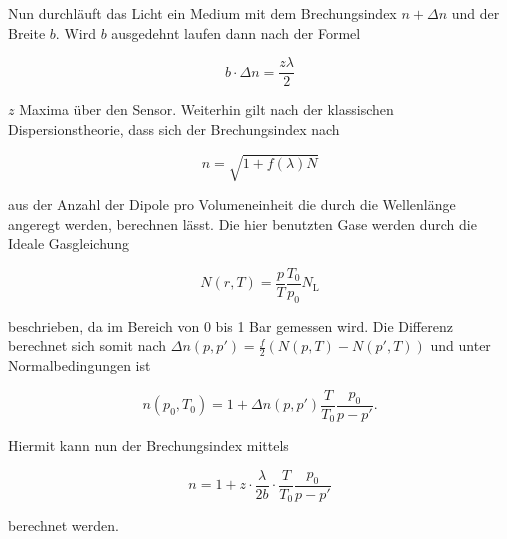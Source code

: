         \noindent Nun durchläuft das Licht ein Medium mit dem Brechungsindex $n+\Delta n $ und der Breite $b$. Wird $b$ ausgedehnt laufen 
        dann nach der Formel

        \begin{equation}
            b \cdot \Delta n = \frac{z \lambda}{2}    \nonumber 
        \end{equation}

        \noindent $z$ Maxima über den Sensor. Weiterhin gilt nach der klassischen Dispersionstheorie, dass sich der Brechungsindex nach 
        
        \begin{equation}
            n = \sqrt{1 + f(\lambda) N}    \nonumber 
        \end{equation}

        \noindent aus der Anzahl der Dipole pro Volumeneinheit die durch die Wellenlänge angeregt werden, berechnen lässt. Die hier benutzten 
        Gase werden durch die Ideale Gasgleichung 
        
        \begin{equation}
            N(r,T) = \frac{p}{T} \frac{T_0}{p_0} N_{\text{L}}    \nonumber 
        \end{equation}

        \noindent beschrieben, da im Bereich von 0 bis 1 Bar gemessen wird. Die Differenz berechnet sich somit nach 
        $\Delta n(p,p') = \frac{f}{2}(N(p,T)-N(p',T))$ und unter Normalbedingungen ist 

        \begin{equation}
            n(p_0, T_0) = 1 + \Delta n(p,p') \frac{T}{T_0} \frac{p_0}{p-p'}.    \nonumber 
        \end{equation}

        \noindent Hiermit kann nun der Brechungsindex mittels 

        \begin{equation}
            n = 1 + z \cdot \frac{\lambda}{2b} \cdot \frac{T}{T_0} \frac{p_0}{p - p'}    \nonumber 
        \end{equation}

        \noindent berechnet werden.